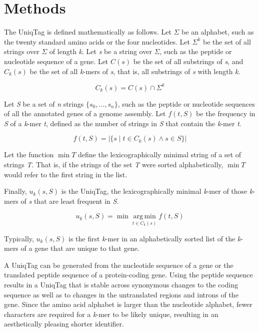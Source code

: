 \documentclass[10pt]{article}
\begin{document}
\section{Methods}\label{methods}

The UniqTag is defined mathematically as follows. Let \(\Sigma\) be an
alphabet, such as the twenty standard amino acids or the four
nucleotides. Let \(\Sigma^k\) be the set of all strings over \(\Sigma\)
of length \emph{k}. Let \emph{s} be a string over \(\Sigma\), such as
the peptide or nucleotide sequence of a gene. Let \(C(s)\) be the set of
all substrings of \emph{s}, and \(C_k(s)\) be the set of all
\emph{k}-mers of \emph{s}, that is, all substrings of \emph{s} with
length \emph{k}.

\[
C_k(s) = C(s) \cap \Sigma^k
\]

Let \emph{S} be a set of \emph{n} strings \(\{s_0, \dots, s_n\}\), such
as the peptide or nucleotide sequences of all the annotated genes of a
genome assembly. Let \(f(t, S)\) be the frequency in \emph{S} of a
\emph{k}-mer \emph{t}, defined as the number of strings in \emph{S} that
contain the \emph{k}-mer \emph{t}.

\[
f(t, S) = \left\vert \{ s \mid t \in C_k(s) \wedge s \in S \} \right\vert
\]

Let the function \(\min T\) define the lexicographically minimal string
of a set of strings \emph{T}. That is, if the strings of the set
\emph{T} were sorted alphabetically, \(\min T\) would refer to the first
string in the list.

Finally, \(u_k(s, S)\) is the UniqTag, the lexicographically minimal
\emph{k}-mer of those \emph{k}-mers of \emph{s} that are least frequent
in \emph{S}.

\[
u_k(s, S) = \min \mathop{\arg\,\min}\limits_{t \in C_k(s)} f(t, S)
\]

Typically, \(u_k(s, S)\) is the first \emph{k}-mer in an alphabetically
sorted list of the \emph{k}-mers of a gene that are unique to that gene.

A UniqTag can be generated from the nucleotide sequence of a gene or the
translated peptide sequence of a protein-coding gene. Using the peptide
sequence results in a UniqTag that is stable across synonymous changes
to the coding sequence as well as to changes in the untranslated regions
and introns of the gene. Since the amino acid alphabet is larger than
the nucleotide alphabet, fewer characters are required for a
\emph{k}-mer to be likely unique, resulting in an aesthetically pleasing
shorter identifier.
\end{document}
